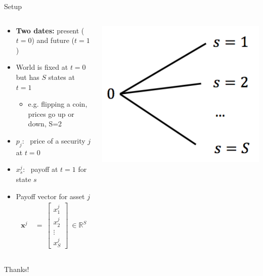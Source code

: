 \documentclass[9pt]{beamer}
\newcommand{\eq}{\ =\ }
\newcommand{\bb}{\mathbb}
\begin{document}
\begin{frame}{Setup}
\begin{columns}
\begin{column}{0.6\textwidth}
  \begin{itemize}
    \item {\bf Two dates:} present ($t=0$) and future ($t=1$)
    \item World is fixed at $t=0$ but has $S$ states at $t=1$
    \begin{itemize}
      \item e.g. flipping a coin, prices go up or down, S=2
    \end{itemize}
    \vspace{1ex}

    \item $p_j$: \ price of a security $j$ at $t=0$
    \item $x^j_s$: \ payoff at $t=1$ for state $s$
    \vspace{2ex}

    \item Payoff vector for asset $j$
    \begin{align*}
      \bm x^j & \eq
      \begin{bmatrix}
        x^j_1 \\
        x^j_2 \\
        \vdots \\
        x^j_S
      \end{bmatrix}
      \ \in \bb R^S
    \end{align*}
  \end{itemize}
\end{column}

\begin{column}{0.38\textwidth} \centering
  \includegraphics[width=.85\textwidth]{images/one-period.PNG}
\end{column}
\end{columns}
\end{frame}



\begin{frame}
\huge{Thanks!}
\end{frame}
\end{document}

